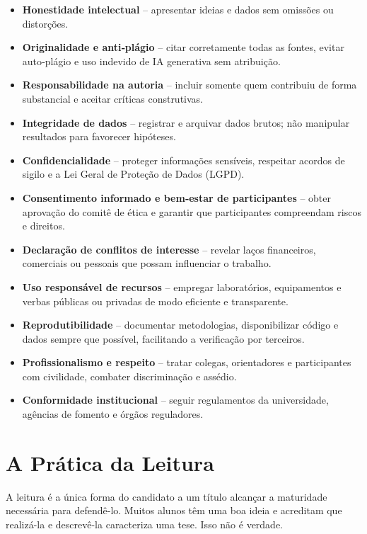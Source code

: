 \begin{itemize}
      \item \textbf{Honestidade intelectual} – apresentar ideias e dados sem omissões ou distorções.
  \item \textbf{Originalidade e anti‑plágio} – citar corretamente todas as fontes, evitar auto‑plágio e uso indevido de IA generativa sem atribuição.
  \item \textbf{Responsabilidade na autoria} – incluir somente quem contribuiu de forma substancial e aceitar críticas construtivas.
  \item \textbf{Integridade de dados} – registrar e arquivar dados brutos; não manipular resultados para favorecer hipóteses.
  \item \textbf{Confidencialidade} – proteger informações sensíveis, respeitar acordos de sigilo e a Lei Geral de Proteção de Dados (LGPD).
  \item \textbf{Consentimento informado e bem‑estar de participantes} – obter aprovação do comitê de ética e garantir que participantes compreendam riscos e direitos.
  \item \textbf{Declaração de conflitos de interesse} – revelar laços financeiros, comerciais ou pessoais que possam influenciar o trabalho.
  \item \textbf{Uso responsável de recursos} – empregar laboratórios, equipamentos e verbas públicas ou privadas de modo eficiente e transparente.
  \item \textbf{Reprodutibilidade} – documentar metodologias, disponibilizar código e dados sempre que possível, facilitando a verificação por terceiros.
  \item \textbf{Profissionalismo e respeito} – tratar colegas, orientadores e participantes com civilidade, combater discriminação e assédio.
  \item \textbf{Conformidade institucional} – seguir regulamentos da universidade, agências de fomento e órgãos reguladores.
\end{itemize}




\section{A Prática da Leitura}


A leitura é a única forma do candidato a um título alcançar a maturidade necessária para defendê-lo. Muitos alunos têm uma boa ideia e acreditam que realizá-la e descrevê-la caracteriza uma tese. Isso não é verdade. 


